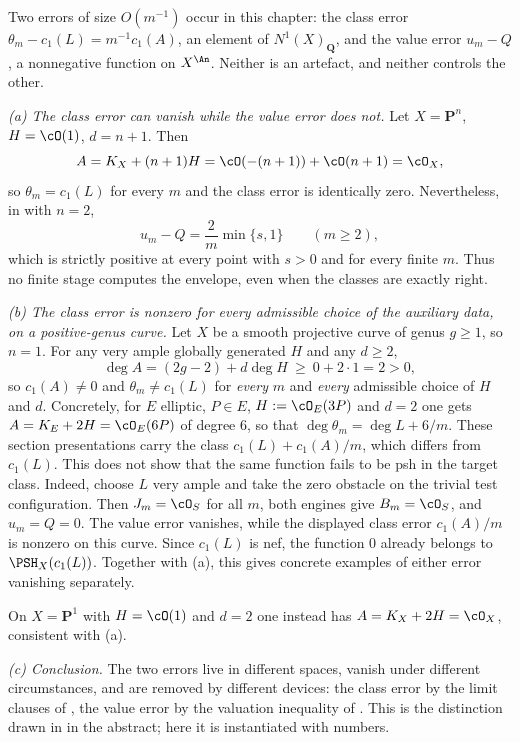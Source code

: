 \begin{example}
\label{ex:ch40-drift-real}
Two errors of size $O(m^{-1})$ occur in this chapter: the class error
$\theta_m-c_1(L)=m^{-1}c_1(A)$, an element of $N^1(X)_{\mathbf Q}$, and
the value error $u_m-Q$, a nonnegative function on $X^{\An}$.  Neither
is an artefact, and neither controls the other.

\emph{(a) The class error can vanish while the value error does not.}  Let
$X=\mathbf P^n$, $H=\cO(1)$, $d=n+1$.  Then
\[
 A=K_X+(n+1)H=\cO(-(n+1))+\cO(n+1)=\cO_X,
\]
so $\theta_m=c_1(L)$ for every $m$ and the class error is identically
zero.  Nevertheless, in  with $n=2$,
\[
 u_m-Q=\frac2m\min\{s,1\}
 \qquad(m\ge2),
\]
which is strictly positive at every point with $s>0$ and for every finite
$m$.  Thus no finite stage computes the envelope, even when the classes are
exactly right.

\emph{(b) The class error is nonzero for every admissible choice of the
auxiliary data, on a positive-genus curve.}  Let $X$ be a smooth projective curve
of genus $g\ge1$, so $n=1$.  For any very ample globally generated
$H$ and any $d\ge2$,
\[
 \deg A=(2g-2)+d\deg H\ \ge\ 0+2\cdot1=2>0,
\]
so $c_1(A)\ne0$ and $\theta_m\ne c_1(L)$ for \emph{every} $m$ and
\emph{every} admissible choice of $H$ and $d$.  Concretely, for $E$
elliptic, $P\in E$, $H:=\cO_E(3P)$ and $d=2$ one gets
$A=K_E+2H=\cO_E(6P)$ of degree $6$, so that
$\deg\theta_m=\deg L+6/m$.  These section presentations carry the class $c_1(L)+c_1(A)/m$,
which differs from $c_1(L)$.  This does not show that the same function
fails to be psh in the target class.  Indeed, choose $L$ very ample and take the zero obstacle on the trivial test configuration.
Then $J_m=\cO_S$ for all $m$, both engines give $B_m=\cO_S$, and
$u_m=Q=0$.  The value error vanishes, while the displayed class error
$c_1(A)/m$ is nonzero on this curve.  Since $c_1(L)$ is nef, the
function $0$ already belongs to $\PSH_X(c_1(L))$.  Together with (a),
this gives concrete examples of either error vanishing separately.

On $X=\mathbf P^1$ with $H=\cO(1)$ and $d=2$ one instead has
$A=K_X+2H=\cO_X$, consistent with (a).

\emph{(c) Conclusion.}  The two errors live in different spaces, vanish
under different circumstances, and are removed by different devices: the
class error by the limit clauses of , the value
error by the valuation inequality of .  This is the
distinction drawn in  in the abstract; here it is
instantiated with numbers.
\end{example}

